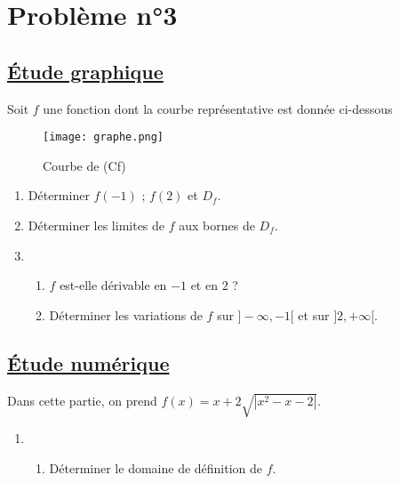 \documentclass[12pt]{article}
\begin{document}
\section*{Problème n°3}

\subsection*{\underline{Étude graphique}}
Soit $f$ une fonction dont la courbe représentative est donnée ci-dessous
\begin{figure}[H]%
\centering
\texttt{[image: graphe.png]}
\caption{Courbe de (Cf)}
\label{fig:monimage}
\end{figure}
\begin{enumerate}
    \item Déterminer $f(-1)$ ; $f(2)$ et $D_f$.
    \item Déterminer les limites de $f$ aux bornes de $D_f$.
    \item 
    \begin{enumerate}
        \item $f$ est-elle dérivable en $-1$ et en $2$ ?
        \item Déterminer les variations de $f$ sur $]-\infty, -1[$ et sur $]2, +\infty[$.
    \end{enumerate}
\end{enumerate}

\subsection*{\underline{Étude numérique}}

Dans cette partie, on prend $f(x) = x + 2\sqrt{|x^2 - x - 2|}$.

\begin{enumerate}
    \item 
    \begin{enumerate}
        \item Déterminer le domaine de définition de $f$.
    \end{enumerate}
\end{enumerate}
\end{document}
